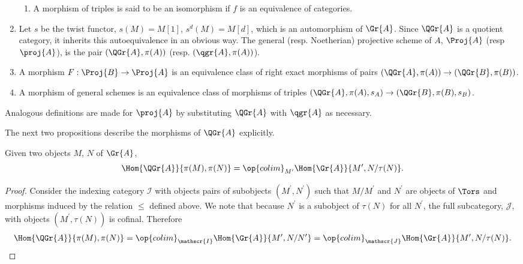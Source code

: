 \begin{defn}
\begin{enumerate}
\begin{enumerate}
    \item
      A morphism of triples is said to be an isomorphism if $f$ is an equivalence of categories.
    \end{enumerate}
  \item
    Let $s$ be the twist functor, $s(M) = M[1]$, $s^d(M) = M[d]$, which is an automorphism of $\Gr{A}$.
    Since $\QGr{A}$ is a quotient category, it inherits this autoequivalence in an obvious way.
    The general (resp. Noetherian) projective scheme of $A$, $\Proj{A}$ (resp $\proj{A}$), is the pair $(\QGr{A}, \pi(A))$ (resp. $(\qgr{A}, \pi(A))$).
  \item
    A morphism $F :\Proj{B} \rightarrow \Proj{A}$ is an equivalence class of right exact morphisms of pairs $(\QGr{A}, \pi(A)) \rightarrow (\QGr{B}, \pi(B))$.
  \item
    A morphism of general schemes is an equivalence class of morphisms of triples $(\QGr{A}, \pi(A), s_A) \rightarrow (\QGr{B}, \pi(B), s_B)$.
  \end{enumerate}
  Analogous definitions are made for $\proj{A}$ by substituting $\QGr{A}$ with $\qgr{A}$ as necessary.
\end{defn}

The next two propositions describe the morphisms of $\QGr{A}$ explicitly.

\begin{prop}
  Given two objects $M$, $N$ of $\Gr{A}$, 
  $$\Hom{\QGr{A}}{\pi(M), \pi(N)} = \op{colim}_{M^\prime}\Hom{\Gr{A}}{M^\prime, N/\tau(N)}.$$
  
  \begin{proof}
    Consider the indexing category $\mathscr{I}$ with objects pairs of subobjects $(M^\prime, N^\prime)$ such that $M/M^\prime$ and $N^\prime$ are objects of $\Tors$ and morphisms induced by the relation $\leq$ defined above.
    We note that because $N^\prime$ is a subobject of $\tau(N)$ for all $N^\prime$, the full subcategory, $\mathscr{J}$, with objects $(M^\prime, \tau(N))$ is cofinal.
    Therefore
    $$\Hom{\QGr{A}}{\pi(M), \pi(N)} = \op{colim}_{\mathscr{I}}\Hom{\Gr{A}}{M^\prime, N/N^\prime} = \op{colim}_{\mathscr{J}}\Hom{\Gr{A}}{M^\prime, N/\tau(N)}.$$
  \end{proof}
\end{prop}

